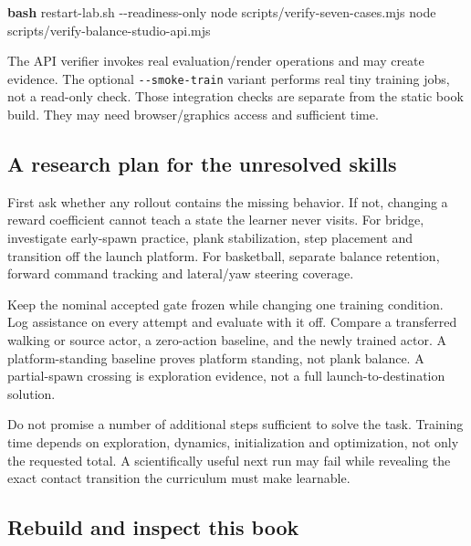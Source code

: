 \documentclass[
  american,
  11pt,
  letterpaper,
]{article}
\newenvironment{Shaded}{\begin{snugshade}}{\end{snugshade}}
\newcommand{\AttributeTok}[1]{\textcolor[rgb]{0.13,0.29,0.53}{#1}}
\newcommand{\ExtensionTok}[1]{#1}
\newcommand{\FunctionTok}[1]{\textcolor[rgb]{0.13,0.29,0.53}{\textbf{#1}}}
\newcommand{\NormalTok}[1]{#1}
\renewenvironment{Shaded}{\par\smallskip}{\par\smallskip}
\begin{document}
\begin{Shaded}
\begin{Highlighting}[]
\FunctionTok{bash}\NormalTok{ restart{-}lab.sh }\AttributeTok{{-}{-}readiness{-}only}
\ExtensionTok{node}\NormalTok{ scripts/verify{-}seven{-}cases.mjs}
\ExtensionTok{node}\NormalTok{ scripts/verify{-}balance{-}studio{-}api.mjs}
\end{Highlighting}
\end{Shaded}

The API verifier invokes real evaluation/render operations and may
create evidence. The optional
\texttt{-\allowbreak{}-\allowbreak{}smoke-\allowbreak{}train} variant
performs real tiny training jobs, not a read-only check. Those
integration checks are separate from the static book build. They may
need browser/graphics access and sufficient time.

\subsection{A research plan for the unresolved
skills}\label{a-research-plan-for-the-unresolved-skills}

First ask whether any rollout contains the missing behavior. If not,
changing a reward coefficient cannot teach a state the learner never
visits. For bridge, investigate early-spawn practice, plank
stabilization, step placement and transition off the launch platform.
For basketball, separate balance retention, forward command tracking and
lateral/yaw steering coverage.

Keep the nominal accepted gate frozen while changing one training
condition. Log assistance on every attempt and evaluate with it off.
Compare a transferred walking or source actor, a zero-action baseline,
and the newly trained actor. A platform-standing baseline proves
platform standing, not plank balance. A partial-spawn crossing is
exploration evidence, not a full launch-to-destination solution.

Do not promise a number of additional steps sufficient to solve the
task. Training time depends on exploration, dynamics, initialization and
optimization, not only the requested total. A scientifically useful next
run may fail while revealing the exact contact transition the curriculum
must make learnable.

\subsection{Rebuild and inspect this
book}\label{rebuild-and-inspect-this-book}
\end{document}
